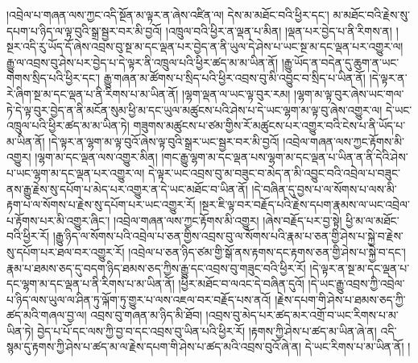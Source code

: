 །འབྲེལ་པ་གཞན་ལས་ཀྱང་འདི་སྔོན་མ་ལྟར་ན་ཞེས་འཛིན་ལ། དེས་མ་མཐོང་བའི་ཕྱིར་དང་། མ་མཐོང་བའི་རྗེས་སུ་དཔག་པ་ཉིད་ལ་ལྟ་བུའི་སྒྲ་སྦྱར་བར་མི་བྱའོ། །འཁྲུལ་བའི་ཕྱིར་ན་ལྡན་པ་མིན། །ལྡན་པར་བྱེད་པ་ནི་རིགས་ན། །སྔར་འདི་རུ་ཡོད་དོ་ཞེས་འབྲས་བུ་སྔ་མ་དང་ལྡན་པར་བྱེད་ན་ནི་ཡུལ་དེ་ཤེས་པ་ཡང་སྔ་མ་དང་ལྡན་པར་འགྱུར་ལ། རྒྱུ་ལ་འབྲས་བུ་ཤེས་པར་བྱེད་པ་དེ་ལྟར་ནི་འཁྲུལ་པའི་ཕྱིར་ཚད་མ་མ་ཡིན་ནོ། །རྒྱུ་ཡོད་ན་བདེན་དུ་ཆུག་ན་ཡང་གེགས་སྲིད་པའི་ཕྱིར་དང་། རྒྱུ་གཞན་མ་ཚོགས་པ་སྲིད་པའི་ཕྱིར་འབྲས་བུ་མི་འབྱུང་བ་སྲིད་པ་ཡིན་ནོ། །དེ་ལྟར་ན་རེ་ཞིག་སྔ་མ་དང་ལྡན་པ་ནི་རིགས་པ་མ་ཡིན་ནོ། །ལྷག་ལྡན་ལ་ཡང་ལྟ་བུར་རམ། །ལྷག་མ་ལྟ་བུར་ཞེས་ཡང་གལ་ཏེ་དེ་ལྟ་བུར་བྱེད་ན་ནི་མངོན་སུམ་ཕྱི་མ་དང་ཡུལ་མཚུངས་པའི་ཤེས་པ་དེ་ཡང་ལྷག་མ་ལྟ་བུ་ཞེས་འགྱུར་ལ། དེ་ཡང་འཁྲུལ་པའི་ཕྱིར་ཚད་མ་མ་ཡིན་ཏེ། གཟུགས་མཚུངས་པ་ཙམ་གྱིས་རོ་མཚུངས་པར་འགྱུར་བའི་ངེས་པ་ནི་ཡོད་པ་མ་ཡིན་ནོ། །དེ་ལྟར་ན་ལྷག་མ་ལྟ་བུའོ་ཞེས་ལྟ་བུའི་སྒྲར་ཡང་སྦྱར་བར་མི་བྱའོ། །འབྲེལ་གཞན་ལས་ཀྱང་རྟོགས་མི་འགྱུར། །ལྷག་མ་དང་ལྡན་ལས་འགྱུར་མིན། །གང་རྒྱུ་ལྷག་མ་དང་ལྡན་པས་ལྷག་མ་དང་ལྡན་པ་ཡིན་ན་ནི་དེའི་ཤེས་པ་ཡང་ལྷག་མ་དང་ལྡན་པར་འགྱུར་ལ། དེ་ལྟར་ཡང་འབྲས་བུ་མ་བཟུང་བ་མེད་ན་མི་འབྱུང་བའི་འབྲེལ་པ་བཟུང་ནས་རྒྱུ་རྗེས་སུ་དཔོག་པ་མེད་པར་འགྱུར་ན་དེ་ཡང་མཐོང་བ་ཡིན་ནོ། །དེ་བཞིན་དུ་བྱས་པ་ལ་སོགས་པ་ལས་མི་རྟག་པ་ལ་སོགས་པ་རྗེས་སུ་དཔོག་པར་ཡང་འགྱུར་རོ། །སྔར་ཇི་ལྟ་བར་བརྗོད་པའི་རྗེས་དཔག་རྣམས་ལ་ཡང་འབྲེལ་པ་རྟོགས་པར་མི་འགྱུར་ཞིང་། །འབྲེལ་གཞན་ལས་ཀྱང་རྟོགས་མི་འགྱུར། །ཞེས་བརྗོད་པར་བྱ་སྟེ། ཕྱི་མ་ལ་མཐོང་བའི་ཕྱིར་རོ། །རྒྱུ་ཉིད་ལ་སོགས་པའི་འབྲེལ་པ་ཅན་གྱིས་འབྲས་བུ་ལ་སོགས་པའི་རྣམ་པ་ཅན་གྱི་ཤེས་པ་སྐྱེ་བ་རྗེས་སུ་དཔོག་པར་ཐལ་བར་འགྱུར་རོ། །འབྲེལ་པ་ཅན་ཉིད་ཙམ་གྱི་སྒོ་ནས་རྟགས་དང་རྟགས་ཅན་གྱི་ཤེས་པ་སྐྱེ་བ་དང་། རྣམ་པ་ཐམས་ཅད་དུ་བདག་ཉིད་ཐམས་ཅད་ཀྱིས་རྒྱུ་དང་འབྲས་བུ་གཟུང་བའི་ཕྱིར་རོ། །དེ་ལྟར་ན་སྔ་མ་དང་ལྡན་པ་དང་ལྷག་མ་དང་ལྡན་པ་ནི་རིགས་པ་མ་ཡིན་ནོ། །ཕྱིར་མཐོང་བ་ལའང་དེ་བཞིན་དུའོ། །དེ་ཡང་རྒྱུ་འབྲས་ཀྱི་འབྲེལ་པ་ཉིད་ལས་ཡུལ་ལ་ཤིན་ཏུ་ལྐོག་ཏུ་གྱུར་པ་ལས་འཇལ་བར་བརྗོད་པས་ནའོ། །རྗེས་དཔག་གི་ཤེས་པ་ཐམས་ཅད་ཀྱི་ཚད་མའི་གཞལ་བྱ་ལ། འབྲས་བུ་གཞན་མ་ཉིད་མི་ཐོབ། །འབྲས་བུ་མེད་པར་ཚད་མར་འགྲོ་བ་ཡང་རིགས་པ་མ་ཡིན་ཏེ། བྱེད་པ་པོ་དང་ལས་ཀྱི་བྱ་བ་དང་འབྲས་བུ་ཡིན་པའི་ཕྱིར་རོ། །རྟགས་ཀྱི་ཤེས་པ་ཚད་མ་ཡིན་ཞེ་ན། འདི་སྙམ་དུ་རྟགས་ཀྱི་ཤེས་པ་ཚད་མ་ལ་རྗེས་དཔག་གི་ཤེས་པ་ཚད་མའི་འབྲས་བུའོ་ཞེ་ན། དེ་ཡང་རིགས་པ་མ་ཡིན་ནོ། །
